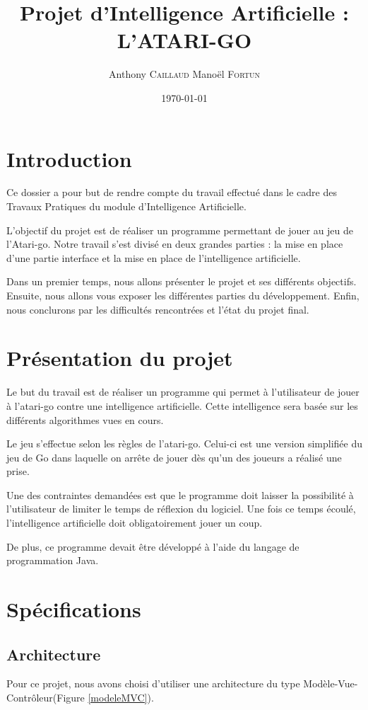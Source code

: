 \documentclass[11pt,a4paper]{article}
\title{Projet d'Intelligence Artificielle : L'ATARI-GO}
\author{Anthony \textsc{Caillaud} Manoël \textsc{Fortun}}
\date{\today}
\begin{document}
	\maketitle
	\clearpage
	\tableofcontents
	\clearpage

\section{Introduction}
Ce dossier a pour but de rendre compte du travail effectué dans le cadre des
Travaux Pratiques du module d'Intelligence Artificielle.

 L'objectif du projet est de réaliser un programme permettant de jouer au jeu
 de l'Atari-go. Notre travail s'est divisé en deux grandes parties : 
 la mise en place d'une partie interface et la mise en place de l'intelligence 
 artificielle.

Dans un premier temps, nous allons présenter le projet et ses
différents objectifs. Ensuite, nous allons vous exposer les
différentes parties du développement. Enfin, nous conclurons par les
difficultés rencontrées et l'état du projet final.

\section{Présentation du projet}
Le but du travail est de réaliser un programme qui permet à l'utilisateur de
jouer à l’atari-go contre une intelligence artificielle. Cette intelligence
sera basée sur les différents algorithmes vues en cours.

Le jeu s'effectue selon les règles de l'atari-go. Celui-ci est une version
simplifiée du jeu de Go dans laquelle on arrête de jouer dès qu’un des joueurs
a réalisé une prise.

Une des contraintes demandées est que le programme doit laisser la possibilité
à l'utilisateur de limiter le temps de réflexion du logiciel. Une
fois ce temps écoulé, l'intelligence artificielle doit obligatoirement jouer un
coup.

De plus, ce programme devait être développé à l'aide du langage de
programmation Java.
\clearpage
\section{Spécifications}
	\subsection{Architecture}
	Pour ce projet, nous avons choisi d'utiliser une architecture du type
	Modèle-Vue-Contrôleur(Figure \ref{modeleMVC}).
	
\end{document}
